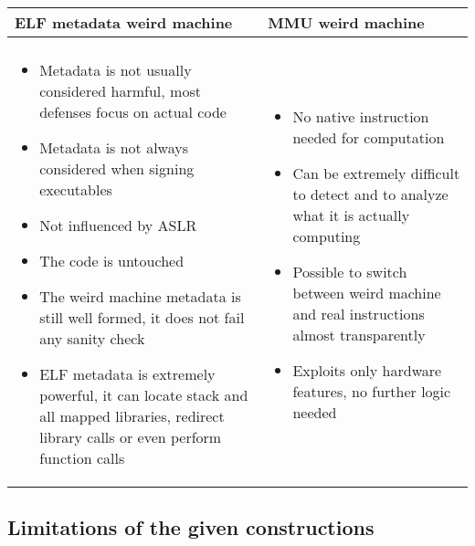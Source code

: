 \documentclass[11pt,twoside,a4paper]{article}
\begin{document}
\begin{longtable}{ p{} | p{} }
\bfseries{ELF metadata weird machine} & \bfseries{MMU weird machine} \\ \hline \\
\begin{itemize}
\item Metadata is not usually considered harmful, most defenses focus on actual code
\item Metadata is not always considered when signing executables
\item Not influenced by ASLR
\item The code is untouched
\item The weird machine metadata is still well formed, it does not fail any sanity check
\item ELF metadata is extremely powerful, it can locate stack and all mapped libraries, redirect library calls or even perform function calls
\end{itemize}
&
\begin{itemize}
\item No native instruction needed for computation
\item Can be extremely difficult to detect and to analyze what it is actually computing
\item Possible to switch between weird machine and real instructions almost transparently
\item Exploits only hardware features, no further logic needed
\end{itemize} \\

\end{longtable}


\subsection{Limitations of the given constructions}
\end{document}

